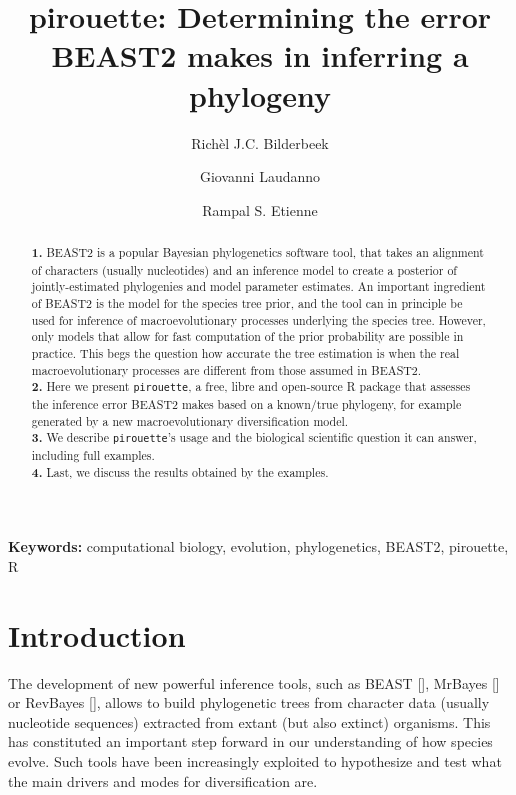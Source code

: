 \documentclass{article}
\title{pirouette: Determining the error BEAST2 makes in inferring a phylogeny}
\author[1]{Rich\`el J.C. Bilderbeek}
\author[1]{Giovanni Laudanno}
\author[1]{Rampal S. Etienne}
\affil[1]{Groningen Institute for Evolutionary Life Sciences, University of Groningen, Groningen, The Netherlands}
\begin{document}
\maketitle

\begin{abstract}

  \textbf{1. }
    BEAST2 is a popular Bayesian phylogenetics software tool,
    that takes an alignment of characters (usually nucleotides) 
    and an inference model to create a
    posterior of jointly-estimated phylogenies and model parameter 
    estimates. An important ingredient of BEAST2 is 
    the model for the species tree prior, 
    and the tool can in principle be used for inference of 
    macroevolutionary processes underlying the species tree. 
    However, only models that allow for fast computation of 
    the prior probability are possible in practice. 
    This begs the question how accurate the tree estimation is 
    when the real macroevolutionary processes are different 
    from those assumed in BEAST2. \\
  \textbf{2. }
    Here we present \verb;pirouette;, 
    a free, libre and open-source R package that assesses 
    the inference error BEAST2 makes based on a known/true 
    phylogeny, for example generated by a new 
    macroevolutionary diversification model. \\
  \textbf{3. }
    We describe \verb;pirouette;'s usage and the biological scientific
    question it can answer, including full examples. \\
  \textbf{4. }
    Last, we discuss the results obtained by the examples. \\
\end{abstract}

{\bf Keywords:} computational biology, evolution, phylogenetics, BEAST2, pirouette, R

\section{Introduction}

The development of new powerful inference tools, 
such as BEAST [\cite{drummond2007beast}], 
MrBayes [\cite{huelsenbeck2001mrbayes}]
or RevBayes [\cite{hohna2016revbayes}], 
allows to build phylogenetic trees 
from character data (usually nucleotide sequences) extracted 
from extant (but also extinct) organisms.
This has constituted an important step forward 
in our understanding of how species evolve.
Such tools have been increasingly exploited to hypothesize 
and test what the main drivers and modes for diversification are.
\end{document}
